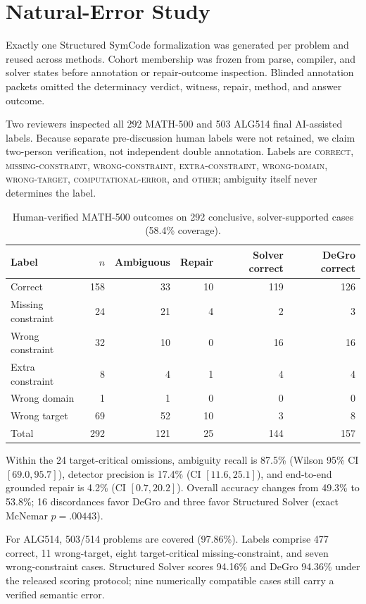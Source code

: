 \documentclass[10pt]{article}
\newcommand{\status}[1]{\textsc{#1}}
\begin{document}
\section{Natural-Error Study}
Exactly one Structured SymCode formalization was generated per problem and reused across methods. Cohort membership was frozen from parse, compiler, and solver states before annotation or repair-outcome inspection. Blinded annotation packets omitted the determinacy verdict, witness, repair, method, and answer outcome.

Two reviewers inspected all 292 MATH-500 and 503 ALG514 final AI-assisted labels. Because separate pre-discussion human labels were not retained, we claim two-person verification, not independent double annotation. Labels are \status{correct}, \status{missing-constraint}, \status{wrong-constraint}, \status{extra-constraint}, \status{wrong-domain}, \status{wrong-target}, \status{computational-error}, and \status{other}; ambiguity itself never determines the label.

\begin{table}[H]
\centering
\caption{Human-verified MATH-500 outcomes on 292 conclusive, solver-supported cases (58.4\% coverage).}
\begin{tabular}{@{}lrrrrr@{}}
\toprule
Label & $n$ & Ambiguous & Repair & Solver correct & DeGro correct\\
\midrule
Correct & 158 & 33 & 10 & 119 & 126\\
Missing constraint & 24 & 21 & 4 & 2 & 3\\
Wrong constraint & 32 & 10 & 0 & 16 & 16\\
Extra constraint & 8 & 4 & 1 & 4 & 4\\
Wrong domain & 1 & 1 & 0 & 0 & 0\\
Wrong target & 69 & 52 & 10 & 3 & 8\\
\midrule
Total & 292 & 121 & 25 & 144 & 157\\
\bottomrule
\end{tabular}
\end{table}
Within the 24 target-critical omissions, ambiguity recall is 87.5\% (Wilson 95\% CI $[69.0,95.7]$), detector precision is 17.4\% (CI $[11.6,25.1]$), and end-to-end grounded repair is 4.2\% (CI $[0.7,20.2]$). Overall accuracy changes from 49.3\% to 53.8\%; 16 discordances favor DeGro and three favor Structured Solver (exact McNemar $p=.00443$).

For ALG514, 503/514 problems are covered (97.86\%). Labels comprise 477 correct, 11 wrong-target, eight target-critical missing-constraint, and seven wrong-constraint cases. Structured Solver scores 94.16\% and DeGro 94.36\% under the released scoring protocol; nine numerically compatible cases still carry a verified semantic error.
\end{document}
